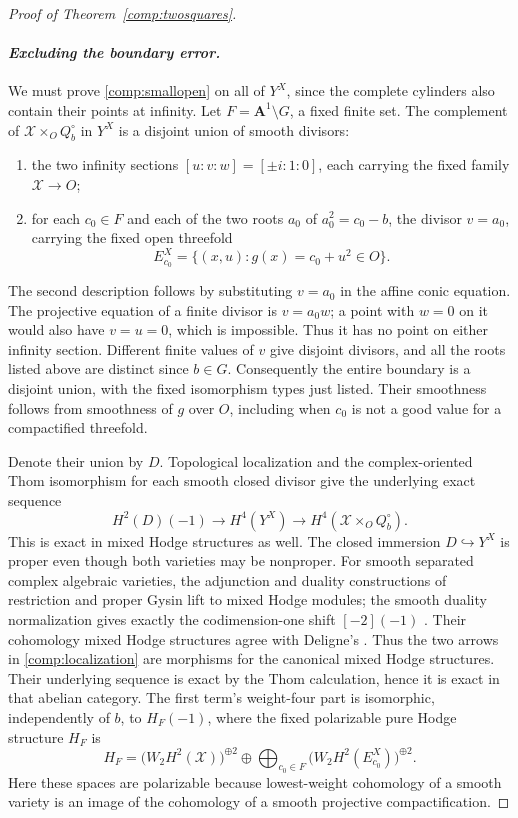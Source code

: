 \documentclass[11pt]{amsart}
\renewcommand{\AA}{\mathbf A}
\theoremstyle{definition}
\theoremstyle{remark}
\numberwithin{equation}{section}
\begin{document}
\begin{proof}[Proof of Theorem~\ref{comp:twosquares}]
\paragraph{\emph{Excluding the boundary error.}}
We must prove \eqref{comp:smallopen} on all of $Y^X$, since the complete
cylinders also contain their points at infinity.  Let
$F=\AA^1\setminus G$, a fixed finite set.  The complement of
$\mathcal X\times_OQ_b^\circ$ in $Y^X$ is a disjoint union of smooth divisors:
\begin{enumerate}
\item the two infinity sections $[u:v:w]=[\pm i:1:0]$, each carrying the
fixed family $\mathcal X\to O$;
\item for each $c_0\in F$ and each of the two roots $a_0$ of
$a_0^2=c_0-b$, the divisor $v=a_0$, carrying the fixed open threefold
\[
 E_{c_0}^X
   =\{(x,u):g(x)=c_0+u^2\in O\}.
\]
\end{enumerate}
The second description follows by substituting $v=a_0$ in the affine
conic equation.  The projective equation of a finite divisor is
$v=a_0w$; a point with $w=0$ on it would also have $v=u=0$, which is
impossible.  Thus it has no point on either infinity section.
Different finite values of $v$ give disjoint divisors, and all the roots
listed above are distinct since $b\in G$.
Consequently the entire boundary is a disjoint union, with the fixed
isomorphism types just listed.
Their smoothness follows from smoothness of $g$ over $O$, including when
$c_0$ is not a good value for a compactified threefold.

Denote their union by $D$.  Topological localization and the
complex-oriented Thom isomorphism for each smooth closed divisor give
the underlying exact sequence
\begin{equation}\label{comp:localization}
 H^2(D)(-1)\longrightarrow H^4(Y^X)
 \longrightarrow H^4(\mathcal X\times_OQ_b^\circ).
\end{equation}
This is exact in mixed Hodge structures as well.  The closed immersion
$D\hookrightarrow Y^X$ is proper even though both varieties may be
nonproper.  For smooth separated complex algebraic varieties, the
adjunction and duality constructions of restriction and proper Gysin
lift to mixed Hodge modules; the smooth duality normalization gives
exactly the codimension-one shift $[-2](-1)$
\cite[Sections~1.2--1.4]{SaitoMHMIntro}.  Their cohomology mixed Hodge
structures agree with Deligne's
\cite[Theorems~0.1--0.2 and the following paragraph]{SaitoMHC}.
Thus the two arrows in \eqref{comp:localization} are morphisms for the
canonical mixed Hodge structures.  Their underlying sequence is exact
by the Thom calculation, hence it is exact in that abelian category.
The first term's weight-four part is isomorphic, independently of $b$,
to $H_F(-1)$, where the fixed polarizable pure Hodge structure $H_F$ is
\[
 H_F=
 \bigl(W_2H^2(\mathcal X)\bigr)^{\oplus2}
 \oplus
 \bigoplus_{c_0\in F}
 \bigl(W_2H^2(E_{c_0}^X)\bigr)^{\oplus2}.
\]
Here these spaces are polarizable because lowest-weight cohomology of a
smooth variety is an image of the cohomology of a smooth projective
compactification.


\end{proof}
\end{document}
